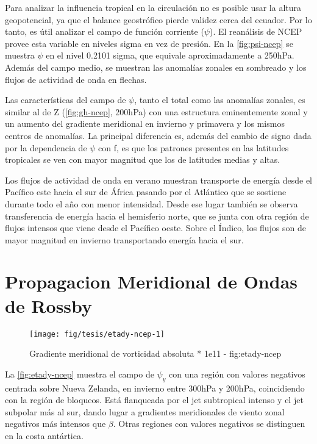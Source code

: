 \documentclass[spanish,a4paper,12p]{book}
\begin{document}
Para analizar la influencia tropical en la circulación no es posible
usar la altura geopotencial, ya que el balance geostrófico pierde
validez cerca del ecuador. Por lo tanto, es útil analizar el campo de
función corriente (\(\psi\)). El reanálisis de NCEP provee esta variable
en niveles sigma en vez de presión. En la \autoref{fig:psi-ncep} se
muestra \(\psi\) en el nivel 0.2101 sigma, que equivale aproximadamente
a 250hPa. Además del campo medio, se muestran las anomalías zonales en
sombreado y los flujos de actividad de onda en flechas.

Las características del campo de \(\psi\), tanto el total como las
anomalías zonales, es similar al de Z (\autoref{fig:gh-ncep}, 200hPa)
con una estructura eminentemente zonal y un aumento del gradiente
meridional en invierno y primavera y los mismos centros de anomalías. La
principal diferencia es, además del cambio de signo dada por la
dependencia de \(\psi\) con f, es que los patrones presentes en las
latitudes tropicales se ven con mayor magnitud que los de latitudes
medias y altas.

Los flujos de actividad de onda en verano muestran transporte de energía
desde el Pacífico este hacia el sur de África pasando por el Atlántico
que se sostiene durante todo el año con menor intensidad. Desde ese
lugar también se observa transferencia de energía hacia el hemisferio
norte, que se junta con otra región de flujos intensos que viene desde
el Pacífico oeste. Sobre el Índico, los flujos son de mayor magnitud en
invierno transportando energía hacia el sur.

\section{Propagacion Meridional de Ondas de
Rossby}\label{propagacion-meridional-de-ondas-de-rossby}

\begin{landscape}\begin{figure}

{\centering \texttt{[image: fig/tesis/etady-ncep-1]} 

}

\caption{Gradiente meridional de vorticidad absoluta * 1e11 - fig:etady-ncep}\label{fig:etady-ncep}
\end{figure}
\end{landscape}

La \autoref{fig:etady-ncep} muestra el campo de \(\psi_y\) con una
región con valores negativos centrada sobre Nueva Zelanda, en invierno
entre 300hPa y 200hPa, coincidiendo con la región de bloqueos. Está
flanqueada por el jet subtropical intenso y el jet subpolar más al sur,
dando lugar a gradientes meridionales de viento zonal negativos más
intensos que \(\beta\). Otras regiones con valores negativos se
distinguen en la costa antártica.
\end{document}
